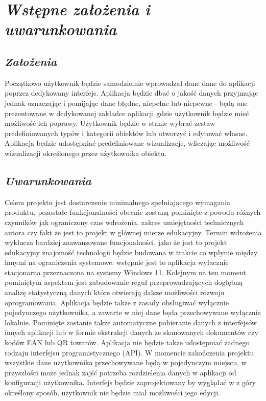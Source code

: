 \documentclass[a4paper,12pt]{report}
\newcommand{\customstylechapter}[1]{\large{\textit{#1}}}
\newcommand{\customstylesection}[1]{\textbf{\textit{#1}}}
\begin{document}
\chapter{\customstylechapter{Wstępne założenia i uwarunkowania}}
\section{\customstylesection{Założenia}}
Początkowo użytkownik będzie samodzielnie wprowadzał dane dane do aplikacji 
poprzez dedykowany interfejs. Aplikacja będzie dbać o jakość danych przyjmując 
jednak oznaczając i pomijając dane błędne, niepełne lub niepewne - będą one 
prezentowane w dedykowanej zakładce aplikacji gdzie użytkownik będzie mieć 
możliwość ich poprawy. Użytkownik będzie w stanie wybrać zestaw 
predefiniowanych typów i kategorii obiektów lub utworzyć i edytować własne. 
Aplikacja będzie udostępniać predefiniowane wizualizacje, wliczając możliwość 
wizualizacji określonego przez użytkownika obiektu.
%
\section{\customstylesection{Uwarunkowania}}
Celem projektu jest dostarczenie minimalnego spełniającego wymagania produktu, 
pozostałe funkcjonalności obecnie zostaną pominięte z powodu różnych czynników 
jak ograniczony czas wdrożenia, zakres umiejętności technicznych autora czy 
fakt że jest to projekt w głównej mierze edukacyjny.
Termin wdrożenia wyklucza bardziej zaawansowane funcjonalności, jako że jest to 
projekt edukacyjny znajomość technologii będzie budowana w trakcie co wpłynie 
między innymi na ograniczenia systemowe: wstępnie jest to aplikacja wyłacznie 
stacjonarna przeznaczona na systemy Windows 11. Kolejnym na ten moment 
pominiętym aspektem jest zabudowanie reguł przeprowadzających dogłębną analizę 
statystyczną danych które otwierają dalsze możliwości rozwoju oprogramowania. 
Aplikacja będzie także z zasady obsługiwać wyłącznie pojedynczego użytkownika, 
a zawarte w niej dane będa przechowywane wyłącznie lokalnie. Pominięte zostanie 
także automatyczne pobieranie danych z interfejsów innych aplikacji lub w 
formie ekstrakcji danych ze skanowanych dokumentów czy kodów EAN lub QR towarów.
 Aplikacja nie będzie takze udostępniać żadnego rodzaju interfejsu 
programistycznego (API). W momencie zakończenia projektu wszystkie dane 
użytkownika przechowywane będą w pojedynczym miejscu, w przyszłości może jednak 
zajść potrzeba rozdzielenia danych w aplikacji od konfiguracji użytkownika. 
Interfejs będzie zaprojektowany by wyglądać w z góry określony sposób, 
użytkownik nie będzie miał możliwości jego edycji.
%
\end{document}

